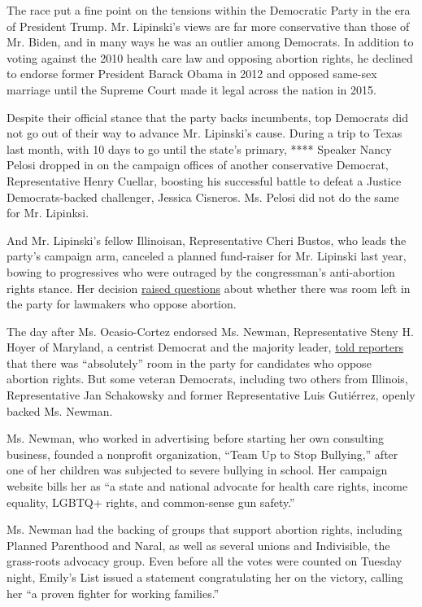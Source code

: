 The race put a fine point on the tensions within the Democratic Party in
the era of President Trump. Mr. Lipinski's views are far more
conservative than those of Mr. Biden, and in many ways he was an outlier
among Democrats. In addition to voting against the 2010 health care law
and opposing abortion rights, he declined to endorse former President
Barack Obama in 2012 and opposed same-sex marriage until the Supreme
Court made it legal across the nation in 2015.

Despite their official stance that the party backs incumbents, top
Democrats did not go out of their way to advance Mr. Lipinski's cause.
During a trip to Texas last month, with 10 days to go until the state's
primary, **** Speaker Nancy Pelosi dropped in on the campaign offices of
another conservative Democrat, Representative Henry Cuellar, boosting
his successful battle to defeat a Justice Democrats-backed challenger,
Jessica Cisneros. Ms. Pelosi did not do the same for Mr. Lipinksi.

And Mr. Lipinski's fellow Illinoisan, Representative Cheri Bustos, who
leads the party's campaign arm, canceled a planned fund-raiser for Mr.
Lipinski last year, bowing to progressives who were outraged by the
congressman's anti-abortion rights stance. Her decision
\href{https://www.nytimes3xbfgragh.onion/2019/05/22/us/politics/dan-lipinski-abortion-cheri-bustos.html}{raised
questions} about whether there was room left in the party for lawmakers
who oppose abortion.

The day after Ms. Ocasio-Cortez endorsed Ms. Newman, Representative
Steny H. Hoyer of Maryland, a centrist Democrat and the majority leader,
\href{https://thehill.com/homenews/house/461972-dem-leader-says-party-can-include-abortion-opponents}{told
reporters} that there was ``absolutely'' room in the party for
candidates who oppose abortion rights. But some veteran Democrats,
including two others from Illinois, Representative Jan Schakowsky and
former Representative Luis Gutiérrez, openly backed Ms. Newman.

Ms. Newman, who worked in advertising before starting her own consulting
business, founded a nonprofit organization, ``Team Up to Stop
Bullying,'' after one of her children was subjected to severe bullying
in school. Her campaign website bills her as ``a state and national
advocate for health care rights, income equality, LGBTQ+ rights, and
common-sense gun safety.''

Ms. Newman had the backing of groups that support abortion rights,
including Planned Parenthood and Naral, as well as several unions and
Indivisible, the grass-roots advocacy group. Even before all the votes
were counted on Tuesday night, Emily's List issued a statement
congratulating her on the victory, calling her ``a proven fighter for
working families.''

